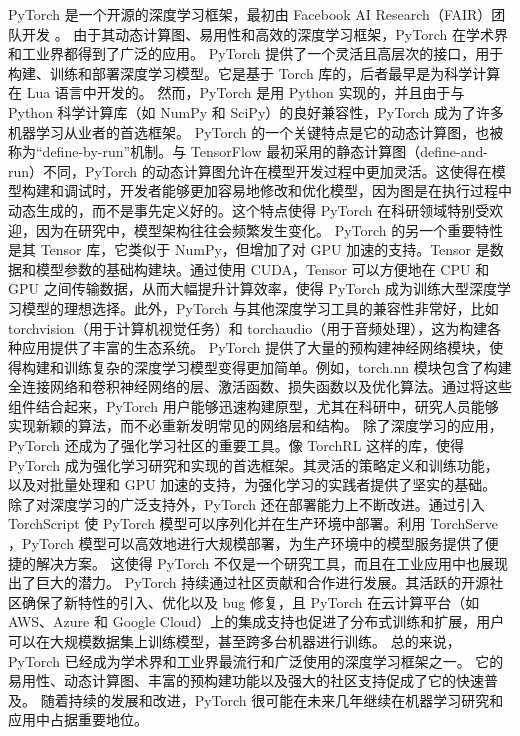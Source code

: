 \documentclass[AutoFakeBold]{LZUThesis-PgD&PhD}
\begin{document}
	PyTorch 是一个开源的深度学习框架，最初由 Facebook AI Research（FAIR）团队开发 \cite{paszke2019pytorch}。
	由于其动态计算图、易用性和高效的深度学习框架，PyTorch 在学术界和工业界都得到了广泛的应用。
	PyTorch 提供了一个灵活且高层次的接口，用于构建、训练和部署深度学习模型。它是基于 Torch 库的，后者最早是为科学计算在 Lua 语言中开发的。
	然而，PyTorch 是用 Python 实现的，并且由于与 Python 科学计算库（如 NumPy 和 SciPy）的良好兼容性，PyTorch 成为了许多机器学习从业者的首选框架。
	PyTorch 的一个关键特点是它的动态计算图，也被称为“define-by-run”机制。与 TensorFlow 最初采用的静态计算图（define-and-run）不同，PyTorch 的动态计算图允许在模型开发过程中更加灵活。这使得在模型构建和调试时，开发者能够更加容易地修改和优化模型，因为图是在执行过程中动态生成的，而不是事先定义好的。这个特点使得 PyTorch 在科研领域特别受欢迎，因为在研究中，模型架构往往会频繁发生变化。
	PyTorch 的另一个重要特性是其 Tensor 库，它类似于 NumPy，但增加了对 GPU 加速的支持。Tensor 是数据和模型参数的基础构建块。通过使用 CUDA，Tensor 可以方便地在 CPU 和 GPU 之间传输数据，从而大幅提升计算效率，使得 PyTorch 成为训练大型深度学习模型的理想选择。此外，PyTorch 与其他深度学习工具的兼容性非常好，比如 torchvision（用于计算机视觉任务）和 torchaudio（用于音频处理），这为构建各种应用提供了丰富的生态系统。
	PyTorch 提供了大量的预构建神经网络模块，使得构建和训练复杂的深度学习模型变得更加简单。例如，torch.nn 模块包含了构建全连接网络和卷积神经网络的层、激活函数、损失函数以及优化算法。通过将这些组件结合起来，PyTorch 用户能够迅速构建原型，尤其在科研中，研究人员能够实现新颖的算法，而不必重新发明常见的网络层和结构。
	除了深度学习的应用，PyTorch 还成为了强化学习社区的重要工具。像 TorchRL 这样的库，使得 PyTorch 成为强化学习研究和实现的首选框架。其灵活的策略定义和训练功能，以及对批量处理和 GPU 加速的支持，为强化学习的实践者提供了坚实的基础。
	除了对深度学习的广泛支持外，PyTorch 还在部署能力上不断改进。通过引入 TorchScript \cite{torchscript} 使 PyTorch 模型可以序列化并在生产环境中部署。利用 TorchServe \cite{torchserve}，PyTorch 模型可以高效地进行大规模部署，为生产环境中的模型服务提供了便捷的解决方案。
	这使得 PyTorch 不仅是一个研究工具，而且在工业应用中也展现出了巨大的潜力。
	PyTorch 持续通过社区贡献和合作进行发展。其活跃的开源社区确保了新特性的引入、优化以及 bug 修复，且 PyTorch 在云计算平台（如 AWS、Azure 和 Google Cloud）上的集成支持也促进了分布式训练和扩展，用户可以在大规模数据集上训练模型，甚至跨多台机器进行训练。
	总的来说，PyTorch 已经成为学术界和工业界最流行和广泛使用的深度学习框架之一。
	它的易用性、动态计算图、丰富的预构建功能以及强大的社区支持促成了它的快速普及。
	随着持续的发展和改进，PyTorch 很可能在未来几年继续在机器学习研究和应用中占据重要地位。
	
\end{document}

